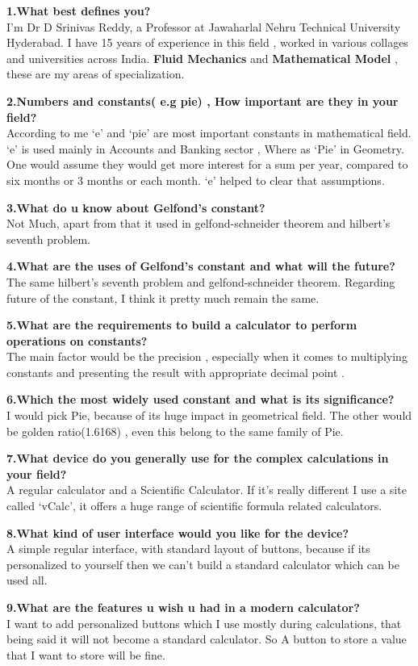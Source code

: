 \documentclass[12pt]{article}
\begin{document}
\textbf{1.What best defines you?}\\
 I’m Dr D Srinivas Reddy, a Professor at Jawaharlal Nehru Technical University Hyderabad. I have 15 years of experience in this field , worked in various collages and universities across India. \textbf{Fluid Mechanics} and \textbf{Mathematical Model} , these are my areas of specialization.
 
\noindent \textbf{2.Numbers and constants( e.g pie) , How important are they in your field?}\\
According to me ‘e’ and ‘pie’ are most important constants in mathematical field.
‘e’ is used mainly in Accounts and Banking sector , Where as ‘Pie’ in Geometry. One would assume they would get more interest for a sum per year, compared to six months or 3 months or each month. ‘e’ helped to clear that assumptions.

\noindent \textbf{3.What do u know about Gelfond's constant?}\\
Not Much, apart from that it used in gelfond-schneider theorem and hilbert's seventh problem.

\noindent \textbf{4.What are the uses of Gelfond's constant and what will the future?}\\
The same hilbert's seventh problem and gelfond-schneider theorem. Regarding future of the constant, I think it pretty much remain the same.

\noindent \textbf{5.What are the requirements to build a calculator to perform operations on  constants?}\\
The main factor would be the precision , especially when it comes to multiplying constants and presenting the result with appropriate decimal point .

\noindent \textbf{6.Which the most widely used constant and what is its  significance?}\\
I would pick Pie, because of its huge impact in geometrical field. The other would be golden ratio(1.6168) , even this belong to the same family of Pie.

\noindent \textbf{7.What device do you generally use for the complex calculations in your field?}\\
A regular calculator and a Scientific Calculator. If it's really different I use a site called  ‘vCalc’, it offers a huge range of scientific formula related calculators.

\noindent \textbf{8.What kind of user interface would you like for the device?}\\
A simple regular interface, with standard layout of buttons, because if its personalized to yourself then we can’t build a standard calculator which can be used all.

\noindent \textbf{9.What are the features u wish u had in a modern calculator?}\\
I want to add personalized buttons which I use mostly during calculations, that being said  it will not become a standard calculator. So A button to store a value that I want to store will be fine.
\end{document}
